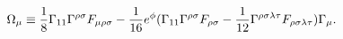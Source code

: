 \begin{equation}
\Omega_{\mu}\equiv 
{1\over 8}\Gamma_{11}\Gamma^{\rho\sigma}F_{\mu\rho\sigma}
-{1\over 16}e^{\phi}(\Gamma_{11}\Gamma^{\rho\sigma}
F_{\rho\sigma}-{1\over 12}\Gamma^{\rho\sigma\lambda\tau}
F_{\rho\sigma\lambda\tau})\Gamma_{\mu}.
\end{equation}


